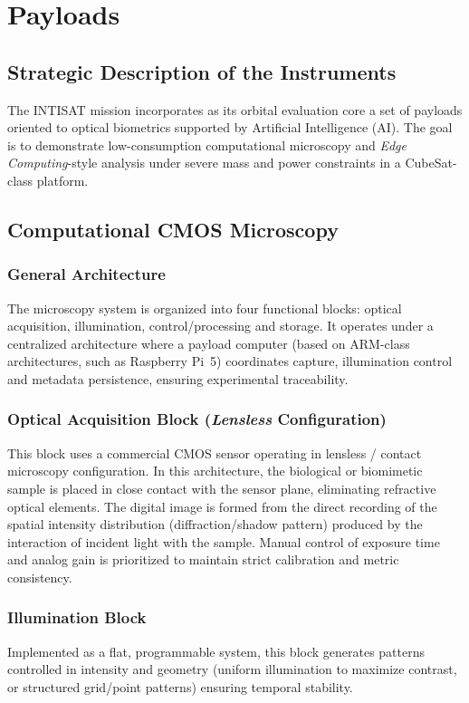 \chapter{Payloads}

\section{Strategic Description of the Instruments}
The INTISAT mission incorporates as its orbital evaluation core a set of payloads oriented to optical biometrics supported by Artificial Intelligence (AI). The goal is to demonstrate low-consumption computational microscopy and \textit{Edge Computing}-style analysis under severe mass and power constraints in a CubeSat-class platform.

\section{Computational CMOS Microscopy}

\subsection{General Architecture}
The microscopy system is organized into four functional blocks: optical acquisition, illumination, control/processing and storage.
It operates under a centralized architecture where a payload computer (based on ARM-class architectures, such as Raspberry Pi~5) coordinates capture, illumination control and metadata persistence, ensuring experimental traceability.

\subsection{Optical Acquisition Block (\textit{Lensless} Configuration)}
This block uses a commercial CMOS sensor operating in lensless / contact microscopy configuration. In this architecture, the biological or biomimetic sample is placed in close contact with the sensor plane, eliminating refractive optical elements. The digital image is formed from the direct recording of the spatial intensity distribution (diffraction/shadow pattern) produced by the interaction of incident light with the sample. Manual control of exposure time and analog gain is prioritized to maintain strict calibration and metric consistency.

\subsection{Illumination Block}
Implemented as a flat, programmable system, this block generates patterns controlled in intensity and geometry (uniform illumination to maximize contrast, or structured grid/point patterns) ensuring temporal stability.

